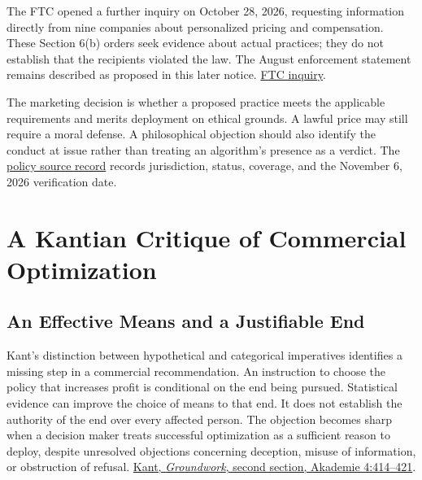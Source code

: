 The FTC opened a further inquiry on October 28, 2026, requesting
information directly from nine companies about personalized pricing and
compensation. These Section 6(b) orders seek evidence about actual
practices; they do not establish that the recipients violated the law.
The August enforcement statement remains described as proposed in this
later notice.
\href{https://www.ftc.gov/news-events/news/press-releases/2026/10/ftc-launches-personalized-pricing-compensation-inquiry}{FTC
inquiry}.

The marketing decision is whether a proposed practice meets the
applicable requirements and merits deployment on ethical grounds. A
lawful price may still require a moral defense. A philosophical
objection should also identify the conduct at issue rather than treating
an algorithm's presence as a verdict. The
\href{../01_Resources/16_AI_Experimentation_and_Pricing/02_Policy/README.md}{policy
source record} records jurisdiction, status, coverage, and the November
6, 2026 verification date.


\hypertarget{M09-a-kantian-critique-of-commercial-optimization}{%
\section{A Kantian Critique of Commercial
Optimization}\label{M09-a-kantian-critique-of-commercial-optimization}}

\noindent \hypertarget{M09-an-effective-means-and-a-justifiable-end}{%
\subsection{An Effective Means and a Justifiable
End}\label{M09-an-effective-means-and-a-justifiable-end}}

\noindent Kant's distinction between hypothetical and categorical imperatives
identifies a missing step in a commercial recommendation. An instruction
to choose the policy that increases profit is conditional on the end
being pursued. Statistical evidence can improve the choice of means to
that end. It does not establish the authority of the end over every
affected person. The objection becomes sharp when a decision maker
treats successful optimization as a sufficient reason to deploy, despite
unresolved objections concerning deception, misuse of information, or
obstruction of refusal.
\href{https://www.gutenberg.org/ebooks/5682}{Kant, \emph{Groundwork},
second section, Akademie 4:414--421}.

